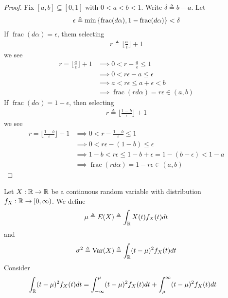 \documentclass{report}
\begin{document}
\begin{proof}
Fix $[a,b]\subseteq [0,1]$ with $0<a<b<1$. Write $\delta\triangleq b-a$. Let 
\begin{align*}
\epsilon  \triangleq \min \left\{ \operatorname{frac}(d\alpha ),1- \operatorname{frac}(d\alpha ) \right\}< \delta  
\end{align*}
If $\operatorname{frac}(d\alpha )=\epsilon $, them selecting 
\begin{align*}
r \triangleq \lfloor \frac{a}{\epsilon } \rfloor + 1
\end{align*}
we see 
\begin{align*}
  r = \lfloor \frac{a}{\epsilon } \rfloor +1&\implies  0 < r- \frac{a}{\epsilon }\leq 1 \\
 &\implies  0 < r\epsilon  - a \leq  \epsilon  \\
 &\implies  a < r\epsilon \leq  a+\epsilon  < b \\
  &\implies  \operatorname{frac}(rd \alpha  )=r\epsilon  \in (a,b)
\end{align*}
If $\operatorname{frac}(d\alpha )= 1-\epsilon $, then selecting 
\begin{align*}
r \triangleq \lfloor \frac{1-b}{\epsilon } \rfloor +1 
\end{align*}
we see 
\begin{align*}
  r = \lfloor \frac{1-b}{\epsilon } \rfloor  +1   &\implies 0 < r - \frac{1-b}{\epsilon }\leq 1 \\
  &\implies 0< r\epsilon  - (1-b) \leq \epsilon  \\
  &\implies 1-b < r \epsilon  \leq  1- b + \epsilon = 1- (b-\epsilon ) < 1-a \\
  &\implies  \operatorname{frac}(rd\alpha )= 1-r\epsilon  \in (a,b)
\end{align*}
\end{proof}
Let $X:\mathbb{R} \rightarrow \mathbb{R}$ be a continuous random variable with distribution $f_X:\mathbb{R} \rightarrow [0,\infty)$. We define 
\begin{align*}
\mu \triangleq E(X)\triangleq \int_{\mathbb{R}} X(t)f_X(t)dt
\end{align*}
and 
\begin{align*}
\sigma^2 \triangleq \operatorname{Var}(X)\triangleq \int_{\mathbb{R}} (t- \mu)^2 f_X(t)dt
\end{align*}
Consider 
\begin{align*}
\int_{\mathbb{R}} (t-\mu)^2 f_X(t) dt&=\int_{-\infty}^{\mu} (t-\mu)^2 f_X(t)dt +    \int_{\mu}^{\infty} (t-\mu)^2 f_X(t)dt
\end{align*}
\end{document}
